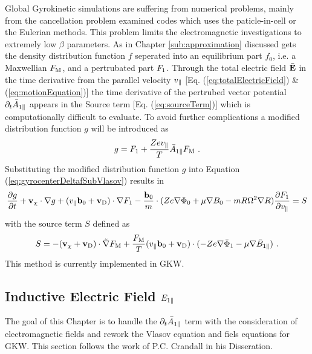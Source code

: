 Global Gyrokinetic simulations are suffering from numerical problems, mainly from the cancellation problem \cite{Chen2001} examined codes \cite{Cummings_PHD} which uses the paticle-in-cell or the Eulerian methods. This problem limits the electromagnetic investigations to extremely low $\beta$ parameters. \cite{Naitou1995} As in Chapter \ref{sub:approximation} discussed gets the density distribution function $f$ seperated into an equilibrium part $f_0$, i.e. a Maxwellian $F_\mathrm{M}$, and a pertrubated part $F_1$. Through the total electric field $\bar{\boldsymbol{\mathbf{E}}}$ in the time derivative from the parallel velocity $v_\parallel$ [Eq. (\ref{eq:totalElectricField}) \& (\ref{eq:motionEquation})] the time derivative of the pertrubed vector potential $\partial_t \bar{A}_{1\parallel}$ appears in the Source term [Eq. (\ref{eq:sourceTerm})] which is computationally difficult to evaluate. To avoid further complications a modified distribution function $g$ will be introduced as
\begin{gather}
	g = F_1 + \frac{Ze v_\parallel}{T} \bar{A}_{1\parallel} F_\mathrm{M} ~.
	\label{eq:modifiedDistrubutionFunction}
\end{gather}
Substituting the modified distribution function $g$ into Equation (\ref{eq:gyrocenterDeltafSubVlasov}) results in
\begin{gather}
	\frac{\partial g}{\partial t} + \boldsymbol{\mathbf{v}}_\chi \cdot \nabla g + (v_\parallel \boldsymbol{\mathbf{b}}_0 + \boldsymbol{\mathbf{v}}_\mathrm{D}) \cdot \nabla F_1 - \frac{\boldsymbol{\mathbf{b}}_0}{m} \cdot (Z e \nabla \Phi_0 + \mu \nabla B_0 - m R \Omega^2 \nabla R) \frac{\partial F_1}{\partial v_\parallel} = S
	\label{eq:modifiedGyrocenterDeltafSubVlasov}
\end{gather}
with the source term $S$ defined as
\begin{gather}
	S = - (\boldsymbol{\mathbf{v}}_\chi + \boldsymbol{\mathbf{v}}_\mathrm{D}) \cdot \tilde{\nabla} F_\mathrm{M} + \frac{F_\mathrm{M}}{T} (v_\parallel \boldsymbol{\mathbf{b}}_0 + \boldsymbol{\mathbf{v}}_\mathrm{D}) \cdot (-Ze \nabla \bar{\Phi}_1 - \mu \nabla \bar{B}_{1\parallel}) ~.
	\label{eq:modifiedSourceTerm}
\end{gather}
This method is currently implemented in GKW\cite{Peeters2009A}.

\newpage


\subsection{Inductive Electric Field $E_{1\parallel}$}
\label{sub:fieldEpar}

The goal of this Chapter is to handle the $\partial_t \bar{A}_{1\parallel}$ term with the consideration of electromagnetic fields and rework the Vlasov equation and fiels equations for GKW. This section follows the work of P.C. Crandall in his Disseration\cite{Crandall_PHD}.
\bigskip

